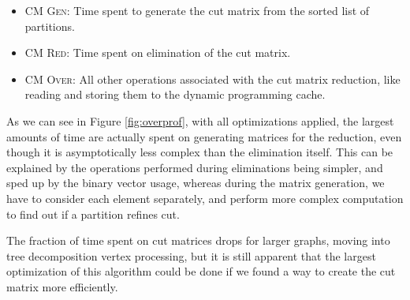 \documentclass[thesis=M,english,hidelinks]{FITthesis}[2012/10/20]
\theoremstyle{definition}
\begin{document}
\begin{itemize}
    \item \textsc{CM Gen}: Time spent to generate the cut matrix from the sorted list of partitions.

    \item \textsc{CM Red}: Time spent on elimination of the cut matrix.

    \item \textsc{CM Over}: All other operations associated with the cut matrix reduction, like reading and storing them
        to the dynamic programming cache.
\end{itemize}

As we can see in Figure \ref{fig:overprof}, with all optimizations applied, the largest amounts of time are actually
spent on generating matrices for the reduction, even though it is asymptotically less complex than the elimination
itself. This can be explained by the operations performed during eliminations being simpler, and sped up by the binary
vector usage, whereas during the matrix generation, we have to consider each element separately, and perform more
complex computation to find out if a partition refines cut.

The fraction of time spent on cut matrices drops for larger graphs, moving into tree decomposition vertex processing,
but it is still apparent that the largest optimization of this algorithm could be done if we found a way to create the
cut matrix more efficiently.
\end{document}

